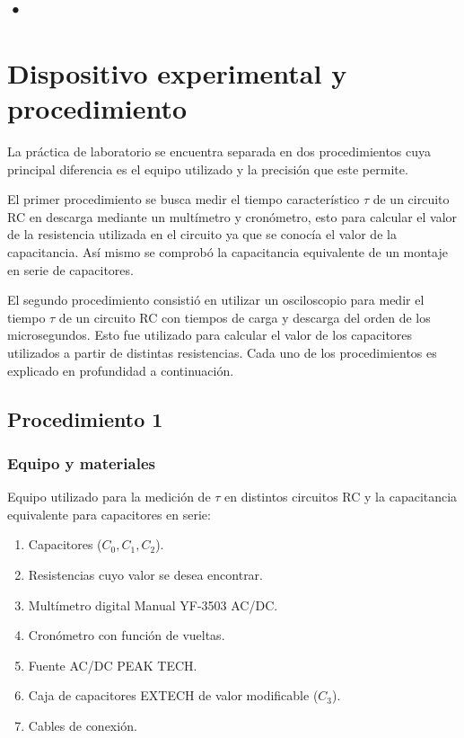 \documentclass[10pt,letter]{article}
\begin{document}
\begin{multicols}{2}
\subsection{•}


\section{Dispositivo experimental y procedimiento}
La práctica de laboratorio se encuentra separada en dos procedimientos cuya principal diferencia es el equipo utilizado y la precisión que este permite. 

El primer procedimiento se busca medir el tiempo característico $\tau$ de un circuito RC en descarga mediante un multímetro y cronómetro, esto para calcular el valor de la resistencia utilizada en el circuito ya que se conocía el valor de la capacitancia. Así mismo se comprobó la capacitancia equivalente de un montaje en serie de capacitores. 

El segundo procedimiento consistió en utilizar un osciloscopio para medir el tiempo $\tau$ de un circuito RC con tiempos de carga y descarga del orden de los microsegundos. Esto fue utilizado para calcular el valor de los capacitores utilizados a partir de distintas resistencias. Cada uno de los procedimientos es explicado en profundidad a continuación.

\subsection{Procedimiento 1}
\subsubsection{Equipo y materiales}
Equipo utilizado para la medición de $\tau$ en distintos circuitos RC y la capacitancia equivalente  para capacitores en serie:
\begin{enumerate}
\itemsep=0em
\item Capacitores ($C_0,C_1,C_2$).
\item Resistencias cuyo valor se desea encontrar.
\item Multímetro digital Manual YF-3503 AC/DC.
\item Cronómetro con función de vueltas. 
\item Fuente AC/DC PEAK TECH.
\item Caja de capacitores EXTECH de valor modificable ($C_3$).
\item Cables de conexión.
\end{enumerate}


\end{multicols}
\end{document}
